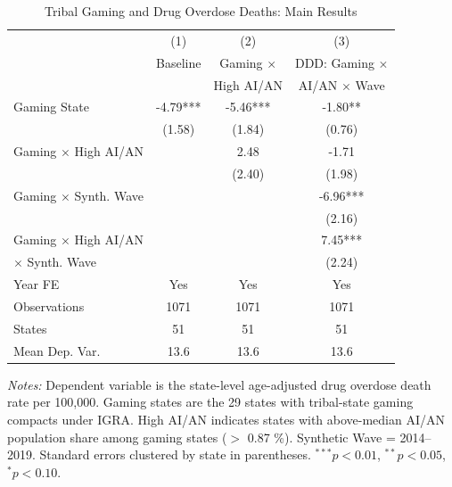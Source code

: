 \begin{table}[htbp]
\centering
\caption{Tribal Gaming and Drug Overdose Deaths: Main Results}
\label{tab:main}
\begin{tabular}{lccc}
\hline\hline
 & (1) & (2) & (3) \\
 & Baseline & Gaming $\times$ & DDD: Gaming $\times$ \\
 & & High AI/AN & AI/AN $\times$ Wave \\
\hline
Gaming State &  -4.79***  &  -5.46***  &  -1.80**  \\
 &  (1.58)  &  (1.84)  &  (0.76)  \\
Gaming $\times$ High AI/AN & &  2.48  &  -1.71  \\
 & &  (2.40)  &  (1.98)  \\
Gaming $\times$ Synth. Wave & & &  -6.96***  \\
 & & &  (2.16)  \\
Gaming $\times$ High AI/AN & & &  7.45***  \\
\quad $\times$ Synth. Wave & & &  (2.24)  \\
\hline
Year FE & Yes & Yes & Yes \\
Observations &  1071  &  1071  &  1071  \\
States &  51  &  51  &  51  \\
Mean Dep. Var. &  13.6  &  13.6  &  13.6  \\
\hline\hline
\end{tabular}
\begin{tablenotes}[flushleft]\footnotesize
\item \textit{Notes:} Dependent variable is the state-level age-adjusted drug overdose death rate per 100,000. Gaming states are the 29 states with tribal-state gaming compacts under IGRA. High AI/AN indicates states with above-median AI/AN population share among gaming states ($>$ 0.87 \%). Synthetic Wave = 2014--2019. Standard errors clustered by state in parentheses. $^{***}p<0.01$, $^{**}p<0.05$, $^{*}p<0.10$.
\end{tablenotes}
\end{table}
